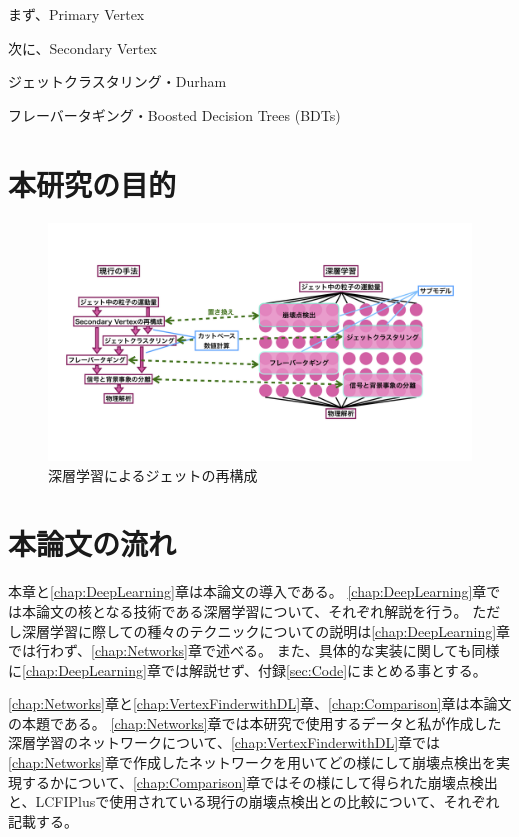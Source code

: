 まず、Primary Vertex

次に、Secondary Vertex

ジェットクラスタリング・Durham

フレーバータギング・Boosted Decision Trees (BDTs)

\section{本研究の目的} \label{Intro:Purpose}

\begin{figure}[htbp]
 \centering
 \includegraphics[width=1.0\textwidth]{Figure/1Introduction/6JetReconstructionwithDeepLearning.png}
 \caption{深層学習によるジェットの再構成}
 \label{6JetReconstructionwithDeepLearning}
\end{figure}


\section{本論文の流れ} \label{Intro:Flow}

本章と\ref{chap:DeepLearning}章は本論文の導入である。
\ref{chap:DeepLearning}章では本論文の核となる技術である深層学習について、それぞれ解説を行う。
ただし深層学習に際しての種々のテクニックについての説明は\ref{chap:DeepLearning}章では行わず、\ref{chap:Networks}章で述べる。
また、具体的な実装に関しても同様に\ref{chap:DeepLearning}章では解説せず、付録\ref{sec:Code}にまとめる事とする。

\ref{chap:Networks}章と\ref{chap:VertexFinderwithDL}章、\ref{chap:Comparison}章は本論文の本題である。
\ref{chap:Networks}章では本研究で使用するデータと私が作成した深層学習のネットワークについて、\ref{chap:VertexFinderwithDL}章では\ref{chap:Networks}章で作成したネットワークを用いてどの様にして崩壊点検出を実現するかについて、\ref{chap:Comparison}章ではその様にして得られた崩壊点検出と、LCFIPlusで使用されている現行の崩壊点検出との比較について、それぞれ記載する。















